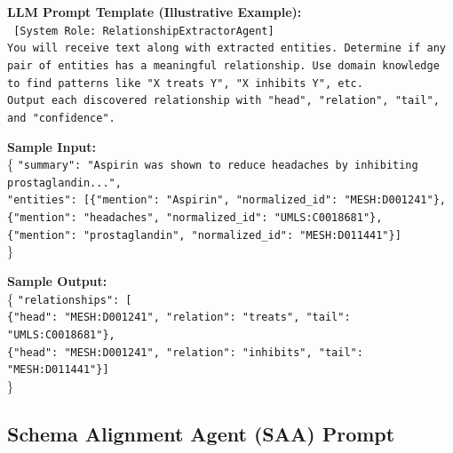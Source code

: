 \documentclass{article}
\begin{document}
\begin{tcolorbox}[colframe=black!25, colback=black!5, boxrule=0.5pt, arc=2pt]
\vspace{1mm}
\noindent
\textbf{LLM Prompt Template (Illustrative Example):}\\
\texttt{
[System Role: RelationshipExtractorAgent]\\
You will receive text along with extracted entities. Determine if any pair of entities has a meaningful relationship. Use domain knowledge to find patterns like "X treats Y", "X inhibits Y", etc.\\
Output each discovered relationship with "head", "relation", "tail", and "confidence".
}

\vspace{1mm}
\noindent
\textbf{Sample Input:}\\
\{
  \texttt{"summary": "Aspirin was shown to reduce headaches by inhibiting prostaglandin...",}\\
  \texttt{"entities": [\{"mention": "Aspirin", "normalized\_id": "MESH:D001241"\}, \\ \{"mention": "headaches", "normalized\_id": "UMLS:C0018681"\},}\\
  \texttt{\{"mention": "prostaglandin", "normalized\_id": "MESH:D011441"\}]}\\
\}

\vspace{1mm}
\noindent
\textbf{Sample Output:}\\
\{
  \texttt{"relationships": [}\\
  \quad \texttt{\{"head": "MESH:D001241", "relation": "treats", "tail": "UMLS:C0018681"\},}\\
  \quad \texttt{\{"head": "MESH:D001241", "relation": "inhibits", "tail": "MESH:D011441"\}]}\\
\}
\end{tcolorbox}
\newpage

\subsection{Schema Alignment Agent (SAA) Prompt}
\label{appendix:saa_prompt}
\end{document}
